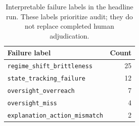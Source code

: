 
\begin{table}[H]
\centering
\caption{Interpretable failure labels in the headline run. These labels prioritize audit; they do not replace completed human adjudication.}
\label{tab:failures}
\begin{tabular}{lr}
\toprule
Failure label & Count \\
\midrule
\texttt{regime\_shift\_brittleness} & 25 \\
\texttt{state\_tracking\_failure} & 12 \\
\texttt{oversight\_overreach} & 7 \\
\texttt{oversight\_miss} & 4 \\
\texttt{explanation\_action\_mismatch} & 2 \\
\bottomrule
\end{tabular}
\end{table}
